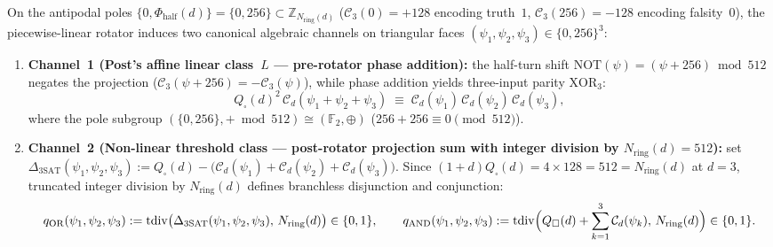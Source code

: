\documentclass[11pt,a4paper]{article}
\theoremstyle{plain}
\theoremstyle{definition}
\begin{document}
On the antipodal poles $\{0,\Phi_{\mathrm{half}}(d)\}=\{0,256\}\subset\mathbb{Z}_{N_{\mathrm{ring}}(d)}$ ($\mathcal{C}_3(0)=+128$ encoding truth~$1$, $\mathcal{C}_3(256)=-128$ encoding falsity~$0$), the piecewise-linear rotator induces two canonical algebraic channels on triangular faces $(\psi_1,\psi_2,\psi_3)\in\{0,256\}^3$:
\begin{enumerate}[leftmargin=*,noitemsep]
\item \textbf{Channel~1 (Post's affine linear class~$L$ --- pre-rotator phase addition):}
  the half-turn shift $\mathrm{NOT}(\psi)=(\psi+256)\bmod 512$ negates the projection ($\mathcal{C}_3(\psi+256)=-\mathcal{C}_3(\psi)$), while phase addition yields three-input parity $\mathrm{XOR}_3$:
  \begin{equation}
    \label{eq:pre-rotator-xor}
    Q_\square(d)^2\,\mathcal{C}_d(\psi_1+\psi_2+\psi_3) \;\equiv\; \mathcal{C}_d(\psi_1)\,\mathcal{C}_d(\psi_2)\,\mathcal{C}_d(\psi_3),
  \end{equation}
  where the pole subgroup $(\{0,256\},+\bmod 512)\cong(\mathbb{F}_2,\oplus)$ ($256+256\equiv 0\pmod{512}$).
\item \textbf{Channel~2 (Non-linear threshold class --- post-rotator projection sum with integer division by $N_{\mathrm{ring}}(d)=512$):}
  set $\Delta_{\mathrm{3SAT}}(\psi_1,\psi_2,\psi_3) := Q_\square(d)-\bigl(\mathcal{C}_d(\psi_1)+\mathcal{C}_d(\psi_2)+\mathcal{C}_d(\psi_3)\bigr)$. Since $(1+d)Q_\square(d)=4\times 128=512=N_{\mathrm{ring}}(d)$ at $d=3$, truncated integer division by $N_{\mathrm{ring}}(d)$ defines branchless disjunction and conjunction:
  \begin{equation}
    \label{eq:post-rotator-or-and}
    q_{\mathrm{OR}}(\psi_1,\psi_2,\psi_3) := \mathrm{tdiv}\bigl(\Delta_{\mathrm{3SAT}}(\psi_1,\psi_2,\psi_3),\,N_{\mathrm{ring}}(d)\bigr)\in\{0,1\},\qquad
    q_{\mathrm{AND}}(\psi_1,\psi_2,\psi_3) := \mathrm{tdiv}\Bigl(Q_\square(d)+\sum_{k=1}^3\mathcal{C}_d(\psi_k),\,N_{\mathrm{ring}}(d)\Bigr)\in\{0,1\}.
  \end{equation}
\end{enumerate}
\end{document}
